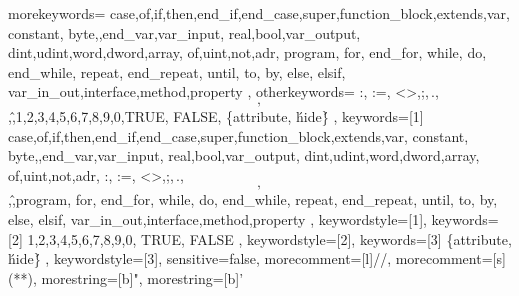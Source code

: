 \graphicspath{{images/}}

\providecommand{\UPSTItitreEnTete}{EthernetIP}


\newcommand{\basepath}{U:\textbackslashDocuments\textbackslashBUT\textbackslashGEII\textbackslashModulesS5\textbackslashAutomatisme_Pour_Robotique\textbackslash}
\newcommand{\subdir}[1]{\basepath{}#1}



{
	morekeywords={
	case,of,if,then,end_if,end_case,super,function_block,extends,var,
	constant, byte,,end_var,var_input, real,bool,var_output,
	dint,udint,word,dword,array, of,uint,not,adr, program, for, end_for, while, do, end_while, repeat, end_repeat, until, to, by, else, elsif, var_in_out,interface,method,property
	},
	otherkeywords={
		:, :=, <>,;,\,.,\[,\],\^,1,2,3,4,5,6,7,8,9,0,TRUE, FALSE, \{attribute,  \'hide\'\}
	},
	keywords=[1]{
		case,of,if,then,end_if,end_case,super,function_block,extends,var,
		constant, byte,,end_var,var_input, real,bool,var_output,
		dint,udint,word,dword,array, of,uint,not,adr, :, :=, <>,;,\,.,\[,\],\^,program, for, end_for, while, do, end_while, repeat, end_repeat, until, to, by, else, elsif, var_in_out,interface,method,property
	},
	keywordstyle=[1]\color{blue},
	keywords=[2]{
		1,2,3,4,5,6,7,8,9,0, TRUE, FALSE
	},
	keywordstyle=[2]\color{codepurple},
	keywords=[3]{
		\{attribute,  \'hide\'\}
	},
	keywordstyle=[3]\color{codegray},
	sensitive=false,
	morecomment=[l]{//}, 
	morecomment=[s]{(*}{*)},
	morestring=[b]{"},
	morestring=[b]{'}
}

